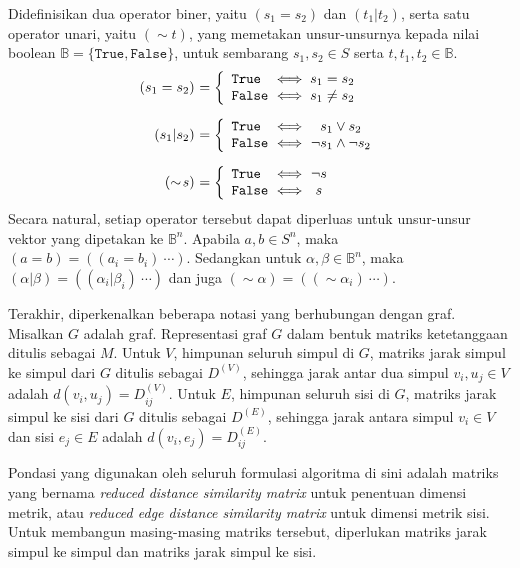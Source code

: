 \documentclass[10pt,twocolumn]{article}
\newcommand{\foreign}[1]{\foreignlanguage{english}{\textit{#1}}}
\def\True{\mathtt{True}}
\def\False{\mathtt{False}}
\def\Bbb{\mathbb{B}}
\begin{document}
Didefinisikan dua operator biner, yaitu \((s_1 = s_2)\) dan \((t_1 | t_2)\), serta satu operator unari, yaitu \((\sim\!t)\), yang memetakan unsur-unsurnya kepada nilai boolean \(\Bbb = \{\True, \False\}\), untuk sembarang \(s_1, s_2 \in S\) serta \(t, t_1, t_2 \in \Bbb\).
\[
\begin{array}{r@{\ }l}
	(s_1 = s_2) &= \left\{
		\begin{array}{l@{\ }l}
			\True  &\iff s_1 = s_2 \\
			\False &\iff s_1 \neq s_2
		\end{array} \right. \\ [16pt]
	(s_1 | s_2) &= \left\{
		\begin{array}{l@{\ }l@{\ }c}
			\True  &\iff& s_1 \vee s_2 \\
			\False &\iff& \neg s_1 \wedge \neg s_2
		\end{array} \right. \\ [16pt]
	(\sim\!s) &= \left\{
		\begin{array}{l@{\ }l@{\ }c}
			\True  &\iff& \neg s \\
			\False &\iff& s
		\end{array} \right.
\end{array}
\]
Secara natural, setiap operator tersebut dapat diperluas untuk unsur-unsur vektor yang dipetakan ke \(\Bbb^n\). Apabila \(a, b \in S^n\), maka \((a = b) = ((a_i = b_i)\ \cdots)\). Sedangkan untuk \(\alpha, \beta \in \Bbb^n\), maka \((\alpha | \beta) = ((\alpha_i | \beta_i)\ \cdots)\) dan juga \((\sim\!\alpha) = ((\sim\!\alpha_i)\ \cdots)\).

Terakhir, diperkenalkan beberapa notasi yang berhubungan dengan graf. Misalkan \(G\) adalah graf. Representasi graf \(G\) dalam bentuk matriks ketetanggaan ditulis sebagai \(M\). Untuk \(V\), himpunan seluruh simpul di \(G\), matriks jarak simpul ke simpul dari \(G\) ditulis sebagai \(D^{(V)}\), sehingga jarak antar dua simpul \(v_i,u_j \in V\) adalah \(d(v_i,u_j) = D^{(V)}_{ij}\). Untuk \(E\), himpunan seluruh sisi di \(G\), matriks jarak simpul ke sisi dari \(G\) ditulis sebagai \(D^{(E)}\), sehingga jarak antara simpul \(v_i \in V\) dan sisi \(e_j \in E\) adalah \(d(v_i,e_j) = D^{(E)}_{ij}\).

Pondasi yang digunakan oleh seluruh formulasi algoritma di sini adalah matriks yang bernama \foreign{reduced distance similarity matrix} untuk penentuan dimensi metrik, atau \foreign{reduced edge distance similarity matrix} untuk dimensi metrik sisi. Untuk membangun masing-masing matriks tersebut, diperlukan matriks jarak simpul ke simpul dan matriks jarak simpul ke sisi.
\end{document}
